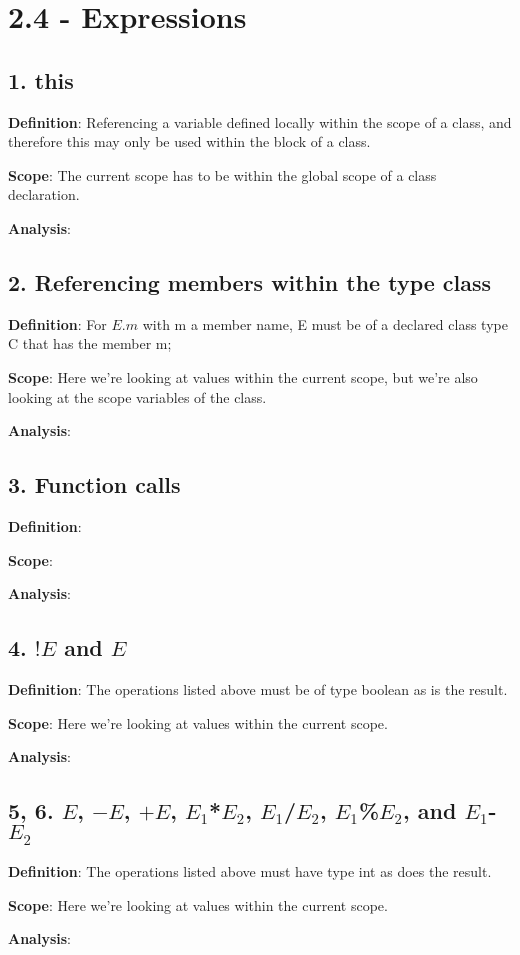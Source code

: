 \documentclass[11pt, oneside]{article}
\begin{document}
\section*{2.4 - Expressions}

\subsection*{1. this}
\par \textbf{Definition}: Referencing a variable defined locally within the scope of a class, and therefore this may only be used within the block of a class.
\par \textbf{Scope}: The current scope has to be within the global scope of a class declaration.
\par \textbf{Analysis}: 

\subsection*{2. Referencing members within the type class}
\par \textbf{Definition}: For $E.m$ with m a member name, E must be of a declared class type C that has the member m;
\par \textbf{Scope}: Here we're looking at values within the current scope, but we're also looking at the scope variables of the class.
\par \textbf{Analysis}: 

\subsection*{3. Function calls}
\par \textbf{Definition}: 
\par \textbf{Scope}: 
\par \textbf{Analysis}: 

\subsection*{4. $!E$ and $E$}
\par \textbf{Definition}: The operations listed above must be of type boolean as is the result.
\par \textbf{Scope}: Here we're looking at values within the current scope.
\par \textbf{Analysis}: 

\subsection*{5, 6. $E$, $-E$, $+E$, $E_1$*$E_2$, $E_1$/$E_2$, $E_1$\%$E_2$, and $E_1$-$E_2$}
\par \textbf{Definition}: The operations listed above must have type int as does the result.
\par \textbf{Scope}: Here we're looking at values within the current scope.
\par \textbf{Analysis}: 
\end{document}
